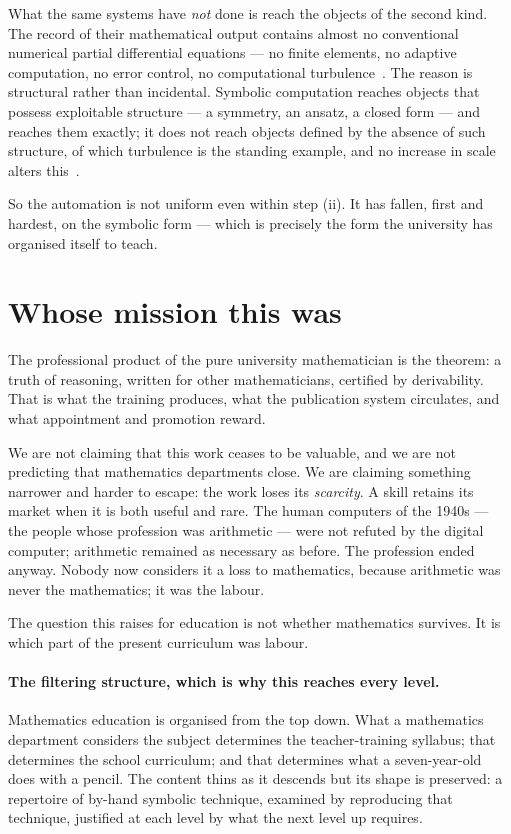 \documentclass[11pt]{article}
\begin{document}
What the same systems have \emph{not} done is reach the objects of the second kind. The record of
their mathematical output contains almost no conventional numerical partial differential equations
--- no finite elements, no adaptive computation, no error control, no computational
turbulence~\cite{aicompmath}. The reason is structural rather than incidental. Symbolic computation
reaches objects that possess exploitable structure --- a symmetry, an ansatz, a closed form --- and
reaches them exactly; it does not reach objects defined by the absence of such structure, of which
turbulence is the standing example, and no increase in scale alters this~\cite{aivsna}.

So the automation is not uniform even within step (ii). It has fallen, first and hardest, on the
symbolic form --- which is precisely the form the university has organised itself to teach.

\section{Whose mission this was}\label{sec:mission}

The professional product of the pure university mathematician is the theorem: a truth of reasoning,
written for other mathematicians, certified by derivability. That is what the training produces,
what the publication system circulates, and what appointment and promotion reward.

We are not claiming that this work ceases to be valuable, and we are not predicting that
mathematics departments close. We are claiming something narrower and harder to escape: the work
loses its \emph{scarcity}. A skill retains its market when it is both useful and rare. The human
computers of the 1940s --- the people whose profession was arithmetic --- were not refuted by the
digital computer; arithmetic remained as necessary as before. The profession ended anyway. Nobody
now considers it a loss to mathematics, because arithmetic was never the mathematics; it was the
labour.

The question this raises for education is not whether mathematics survives. It is which part of the
present curriculum was labour.

\paragraph{The filtering structure, which is why this reaches every level.} Mathematics education is
organised from the top down. What a mathematics department considers the subject determines the
teacher-training syllabus; that determines the school curriculum; and that determines what a
seven-year-old does with a pencil. The content thins as it descends but its shape is preserved: a
repertoire of by-hand symbolic technique, examined by reproducing that technique, justified at each
level by what the next level up requires.
\end{document}
